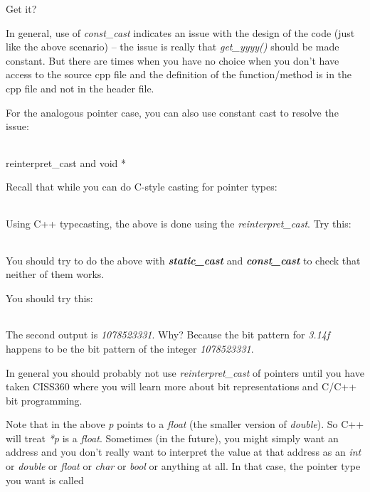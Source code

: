 \documentclass[
]{article}
\begin{document}
\begin{longtable}[]{@{}@{}}
\toprule
\endhead
\bottomrule
\end{longtable}

Get it?

In general, use of \emph{const\_cast} indicates an issue with the design
of the code (just like the above scenario) -- the issue is really that
\emph{get\_yyyy()} should be made constant. But there are times when you
have no choice when you don't have access to the source cpp file and the
definition of the function/method is in the cpp file and not in the
header file.

For the analogous pointer case, you can also use constant cast to
resolve the issue:

\begin{longtable}[]{@{}@{}}
\toprule
\endhead
\bottomrule
\end{longtable}

reinterpret\_cast and void *

Recall that while you can do C-style casting for pointer types:

\begin{longtable}[]{@{}@{}}
\toprule
\endhead
\bottomrule
\end{longtable}

Using C++ typecasting, the above is done using the
\emph{reinterpret\_cast}. Try this:

\begin{longtable}[]{@{}@{}}
\toprule
\endhead
\bottomrule
\end{longtable}

You should try to do the above with \emph{\textbf{static\_cast}} and
\emph{\textbf{const\_cast}} to check that neither of them works.

You should try this:

\begin{longtable}[]{@{}@{}}
\toprule
\endhead
\bottomrule
\end{longtable}

The second output is \emph{1078523331}. Why? Because the bit pattern for
\emph{3.14f} happens to be the bit pattern of the integer
\emph{1078523331}.

In general you should probably not use \emph{reinterpret\_cast} of
pointers until you have taken CISS360 where you will learn more about
bit representations and C/C++ bit programming.

Note that in the above \emph{p} points to a \emph{float} (the smaller
version of \emph{double}). So C++ will treat \emph{*p} is a
\emph{float}. Sometimes (in the future), you might simply want an
address and you don't really want to interpret the value at that address
as an \emph{int} or \emph{double} or \emph{float} or \emph{char} or
\emph{bool} or anything at all. In that case, the pointer type you want
is called
\end{document}
